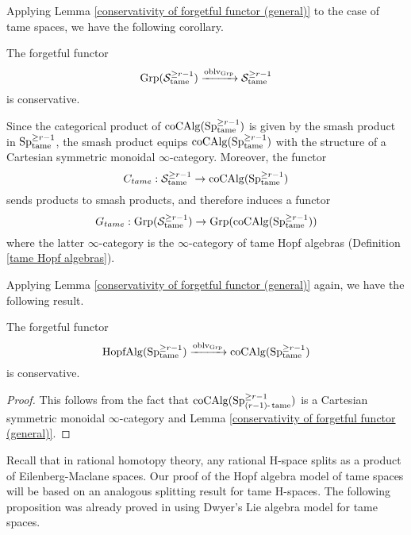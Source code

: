 Applying Lemma \ref{conservativity of forgetful functor (general)} to the case of tame spaces, we have the following corollary.

\begin{corollary}
\label{conservativity of forgetful functor}
	The forgetful functor 
	\[
	\operatorname{Grp}({\mathcal{S}}^{\geq r-1}_{\operatorname{\operatorname{tame}}}) \xrightarrow{\operatorname{oblv}_{\operatorname{Grp}}} 
	{\mathcal{S}}^{\geq r-1}_{\operatorname{\operatorname{tame}}}
	\]
	is conservative.
\end{corollary}

Since the categorical product of $\operatorname{coCAlg}(\operatorname{Sp}^{\geq r-1}_{\operatorname{\operatorname{tame}}})$ is given by the smash product in $\operatorname{Sp}^{\geq r-1}_{\operatorname{\operatorname{tame}}}$, 
the smash product equips $\operatorname{coCAlg}(\operatorname{Sp}^{\geq r-1}_{\operatorname{\operatorname{tame}}})$ with the structure of a Cartesian symmetric monoidal $\infty$-category. Moreover, the functor 
$$C_{tame}: {\mathcal{S}}^{\geq r-1}_{\operatorname{\operatorname{tame}}} \to
\operatorname{coCAlg}(\operatorname{Sp}^{\geq r-1}_{\operatorname{\operatorname{tame}}})$$
sends products to smash products, and therefore induces a functor
\begin{equation}
\label{G_tame}
    G_{tame}:\operatorname{Grp}({\mathcal{S}}^{\geq r-1}_{\operatorname{\operatorname{tame}}})
\to
\operatorname{Grp}(\operatorname{coCAlg}(\operatorname{Sp}^{\geq r-1}_{\operatorname{\operatorname{tame}}}))
\end{equation}
where the latter $\infty$-category is the $\infty$-category of tame Hopf algebras (Definition \ref{tame Hopf algebras}).

Applying Lemma \ref{conservativity of forgetful functor (general)} again, we have the following result.
\begin{corollary}
\label{conservativity of the forgetful functor for Hopf algebras}
		The forgetful functor 
	\[
	\operatorname{HopfAlg}(\operatorname{Sp}^{\geq r-1}_{\operatorname{\operatorname{tame}}}) \xrightarrow{\operatorname{oblv}_{\operatorname{Grp}}} 
	\operatorname{coCAlg}(\operatorname{Sp}^{\geq r-1}_{\operatorname{\operatorname{tame}}})
	\]
	is conservative.
\end{corollary}
\begin{proof}
	This follows from the fact that $\operatorname{coCAlg}(\operatorname{Sp}^{\geq r-1}_{(r-1)\text{-}\operatorname{\operatorname{tame}}})$ is a Cartesian symmetric monoidal $\infty$-category and Lemma \ref{conservativity of forgetful functor (general)}.

\end{proof}

Recall that in rational homotopy theory, any rational H-space splits as a product of Eilenberg-Maclane spaces.
Our proof of the Hopf algebra model of tame spaces will be based on an analogous splitting result for tame H-spaces. 
The following proposition was already proved in \cite[Proposition 1.7]{Scheerer-Tanre} using Dwyer's Lie algebra model for tame spaces. 


